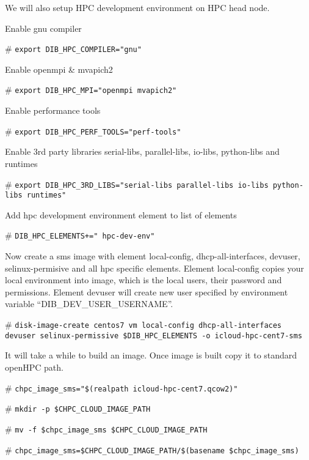 \begin{section}
{We will also setup HPC development environment on HPC head node. 

Enable gnu compiler

\begin{bash}[ctrlr]\# \texttt{\small{export DIB\_HPC\_COMPILER="gnu"}}\end{bash}

Enable openmpi \& mvapich2

\begin{bash}[ctrlr]\# \texttt{\small{export DIB\_HPC\_MPI="openmpi mvapich2"}}\end{bash}

Enable performance tools

\begin{bash}[ctrlr]\# \texttt{\small{export DIB\_HPC\_PERF\_TOOLS="perf-tools"}}\end{bash}

Enable 3rd party libraries serial-libs, parallel-libs, io-libs, python-libs and runtimes

\begin{bash}[ctrlr]\# \texttt{\small{export DIB\_HPC\_3RD\_LIBS="serial-libs parallel-libs io-libs python-libs runtimes"}}\end{bash}

Add hpc development environment element to list of elements

\begin{bash}[ctrlr]\# \texttt{\small{DIB\_HPC\_ELEMENTS+=" hpc-dev-env"}}\end{bash}

Now create a sms image with element local-config, dhcp-all-interfaces, devuser, selinux-permisive and all hpc specific elements. Element local-config copies your local environment into image, which is the local users, their password and permissions. Element devuser will create new user specified by environment variable “DIB\_DEV\_USER\_USERNAME”. 

\begin{bash}[ctrlr]\# \texttt{\small{disk-image-create centos7 vm local-config dhcp-all-interfaces devuser selinux-permissive \$DIB\_HPC\_ELEMENTS -o icloud-hpc-cent7-sms}}\end{bash}

It will take a while to build an image. Once image is built copy it to standard openHPC path.

\begin{bash}[ctrlr]\# \texttt{\small{chpc\_image\_sms="\$(realpath icloud-hpc-cent7.qcow2)"}}\end{bash}
\begin{bash}[ctrlr]\# \texttt{\small{mkdir -p \$CHPC\_CLOUD\_IMAGE\_PATH}}\end{bash}
\begin{bash}[ctrlr]\# \texttt{\small{mv -f \$chpc\_image\_sms \$CHPC\_CLOUD\_IMAGE\_PATH}}\end{bash}
\begin{bash}[ctrlr]\# \texttt{\small{chpc\_image\_sms=\$CHPC\_CLOUD\_IMAGE\_PATH/\$(basename \$chpc\_image\_sms)}}\end{bash}

}
\end{section}
